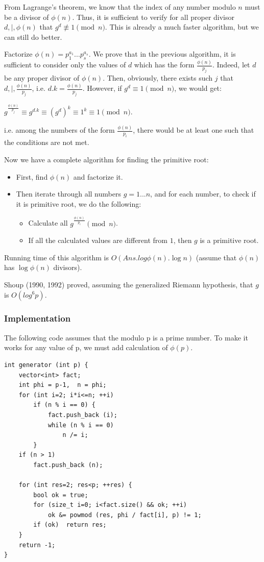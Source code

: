 \documentclass[8pt, a4paper, oneside, twocolumn]{extarticle}
\begin{document}
From Lagrange's theorem, we know that the index of any number modulo $n$ must be a divisor of $\phi (n)$. Thus, it is sufficient to verify for all proper divisor $d , | , \phi (n)$ that $g^d \not \equiv 1 \pmod n$. This is already a much faster algorithm, but we can still do better.

Factorize $\phi (n) = p_1 ^ {a_1} ... p_s ^ {a_s}$. We prove that in the previous algorithm, it is sufficient to consider only the values of $d$ which has the form $\frac { \phi (n) } {p_j}$. Indeed, let $d$ be any proper divisor of $\phi (n)$. Then, obviously, there exists such $j$ that $d , | , \frac { \phi (n) } {p_j}$, i.e. $d . k = \frac { \phi (n) } {p_j}$. However, if $g^d \equiv 1 \pmod n$, we would get:

$g ^ { \frac { \phi (n)} {p_j} } \equiv g ^ {d . k} \equiv (g^d) ^k \equiv 1^k \equiv 1 \pmod n$.

i.e. among the numbers of the form $\frac {\phi (n)} {p_i}$, there would be at least one such that the conditions are not met.

Now we have a complete algorithm for finding the primitive root:
\begin{itemize}
    \item First, find $\phi (n)$ and factorize it.
    \item Then iterate through all numbers $g = 1 ... n$, and for each number, to check if it is primitive root, we do the following:
        \begin{itemize}
        \item Calculate all $g ^ { \frac {\phi (n)} {p_i}} \pmod n$.
        \item If all the calculated values are different from $1$, then $g$ is a primitive root.
        \end{itemize}
\end{itemize}
Running time of this algorithm is $O(Ans . log \phi (n) . \log n)$ (assume that $\phi (n)$ has $\log \phi (n)$ divisors).

Shoup (1990, 1992) proved, assuming the generalized Riemann hypothesis, that $g$ is $O(log^6 p)$.
\subsubsection{Implementation}

The following code assumes that the modulo p is a prime number. To make it works for any value of p, we must add calculation of $\phi (p)$.
\begin{verbatim}
int generator (int p) {
	vector<int> fact;
	int phi = p-1,  n = phi;
	for (int i=2; i*i<=n; ++i)
		if (n % i == 0) {
			fact.push_back (i);
			while (n % i == 0)
				n /= i;
		}
	if (n > 1)
		fact.push_back (n);
 
	for (int res=2; res<p; ++res) {
		bool ok = true;
		for (size_t i=0; i<fact.size() && ok; ++i)
			ok &= powmod (res, phi / fact[i], p) != 1;
		if (ok)  return res;
	}
	return -1;
}
\end{verbatim}
\end{document}
